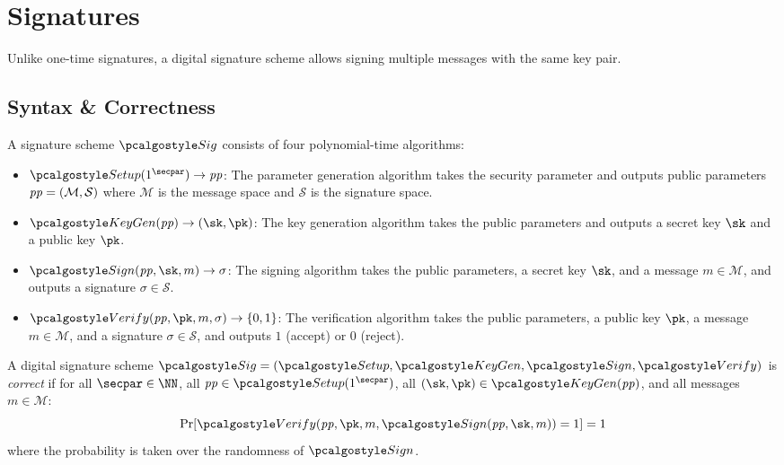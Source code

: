 \section{Signatures}\label{sec:signatures}

 Unlike one-time signatures, a digital signature scheme allows signing multiple messages with the same key pair.

\subsection{Syntax \& Correctness}

\begin{definition}
  A signature scheme $\algo{Sig}$ consists of four polynomial-time algorithms:
  \begin{itemize}
    \item $\algo{Setup}(1^\secpar) \rightarrow \params$: The parameter generation algorithm takes the security parameter and outputs public parameters $\mathit{pp} = (\mathcal{M}, \mathcal{S})$ where $\mathcal{M}$ is the message space and $\mathcal{S}$ is the signature space.
    \item $\algo{KeyGen}(\params) \rightarrow (\sk, \pk)$: The key generation algorithm takes the public parameters and outputs a secret key $\sk$ and a public key $\pk$.
    \item $\algo{Sign}(\params, \sk, m) \rightarrow \sigma$: The signing algorithm takes the public parameters, a secret key $\sk$, and a message $m \in \mathcal{M}$, and outputs a signature $\sigma \in \mathcal{S}$.
    \item $\algo{Verify}(\params, \pk, m, \sigma) \rightarrow \{0, 1\}$: The verification algorithm takes the public parameters, a public key $\pk$, a message $m \in \mathcal{M}$, and a signature $\sigma \in \mathcal{S}$, and outputs $1$ (accept) or $0$ (reject).
  \end{itemize}
\end{definition}

\begin{definition}[Correctness]\label{def:sig-correctness}
  A digital signature scheme $\algo{Sig} = (\algo{Setup}, \algo{KeyGen}, \algo{Sign}, \algo{Verify})$ is \emph{correct} if for all $\secpar \in \NN$, all $\params \in \algo{Setup}(1^\secpar)$, all $(\sk, \pk) \in \algo{KeyGen}(\params)$, and all messages $m \in \mathcal{M}$:
  \[
    \Pr[\algo{Verify}(\params, \pk, m, \algo{Sign}(\params, \sk, m)) = 1] = 1
  \]
  where the probability is taken over the randomness of $\algo{Sign}$.
\end{definition}

